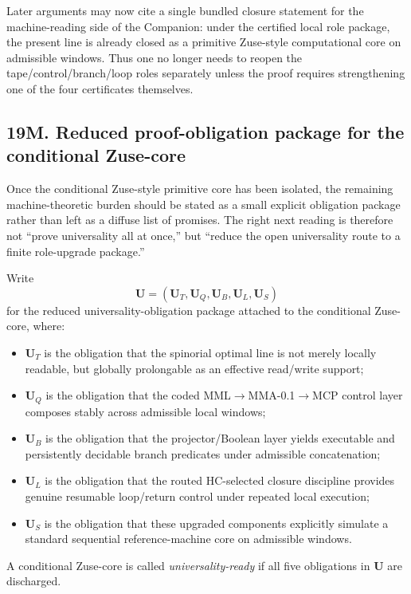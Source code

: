 \begin{corollary}
Later arguments may now cite a single bundled closure statement for the machine-reading side of the Companion: under the certified local role package, the present line is already closed as a primitive Zuse-style computational core on admissible windows. Thus one no longer needs to reopen the tape/control/branch/loop roles separately unless the proof requires strengthening one of the four certificates themselves.
\end{corollary}


\subsection*{19M. Reduced proof-obligation package for the conditional Zuse-core}
Once the conditional Zuse-style primitive core has been isolated, the remaining machine-theoretic burden should be stated as a small explicit obligation package rather than left as a diffuse list of promises. The right next reading is therefore not ``prove universality all at once,'' but ``reduce the open universality route to a finite role-upgrade package.''

\begin{definition}
Write
\[
\mathbf U=(\mathbf U_T,\mathbf U_Q,\mathbf U_B,\mathbf U_L,\mathbf U_S)
\]
for the reduced universality-obligation package attached to the conditional Zuse-core, where:
\begin{itemize}[leftmargin=2em]
 \item $\mathbf U_T$ is the obligation that the spinorial optimal line is not merely locally readable, but globally prolongable as an effective read/write support;
 \item $\mathbf U_Q$ is the obligation that the coded MML$\to$MMA-0.1$\to$MCP control layer composes stably across admissible local windows;
 \item $\mathbf U_B$ is the obligation that the projector/Boolean layer yields executable and persistently decidable branch predicates under admissible concatenation;
 \item $\mathbf U_L$ is the obligation that the routed HC-selected closure discipline provides genuine resumable loop/return control under repeated local execution;
 \item $\mathbf U_S$ is the obligation that these upgraded components explicitly simulate a standard sequential reference-machine core on admissible windows.
\end{itemize}
A conditional Zuse-core is called \emph{universality-ready} if all five obligations in $\mathbf U$ are discharged.
\end{definition}

